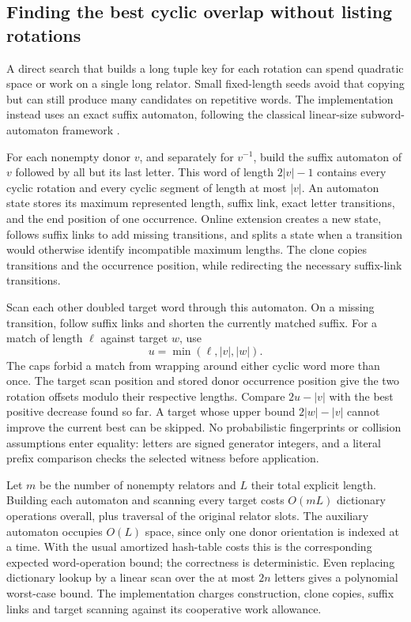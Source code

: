 \subsection{Finding the best cyclic overlap without listing rotations}

A direct search that builds a long tuple key for each rotation can spend
quadratic space or work on a single long relator.  Small fixed-length
seeds avoid that copying but can still produce many candidates on
repetitive words.  The implementation instead uses an exact suffix
automaton, following the classical linear-size subword-automaton
framework \cite{blumer-subwords}.

For each nonempty donor $v$, and separately for $v^{-1}$, build the
suffix automaton of $v$ followed by all but its last letter.  This word of
length $2|v|-1$ contains every cyclic rotation and every cyclic segment of
length at most $|v|$.  An automaton state stores its maximum represented
length, suffix link, exact letter transitions, and the end position of
one occurrence.  Online extension creates a new state, follows suffix
links to add missing transitions, and splits a state when a transition
would otherwise identify incompatible maximum lengths.  The clone copies
transitions and the occurrence position, while redirecting the necessary
suffix-link transitions.

Scan each other doubled target word through this automaton.  On a missing
transition, follow suffix links and shorten the currently matched suffix.
For a match of length $\ell$ against target $w$, use
\[
 u=\min(\ell,|v|,|w|).
\]
The caps forbid a match from wrapping around either cyclic word more than
once.  The target scan position and stored donor occurrence position give
the two rotation offsets modulo their respective lengths.  Compare
$2u-|v|$ with the best positive decrease found so far.  A target whose
upper bound $2|w|-|v|$ cannot improve the current best can be skipped.
No probabilistic fingerprints or collision assumptions enter equality:
letters are signed generator integers, and a literal prefix comparison
checks the selected witness before application.

Let $m$ be the number of nonempty relators and $L$ their total explicit
length.  Building each automaton and scanning every target costs
$O(mL)$ dictionary operations overall, plus traversal of the original
relator slots.  The auxiliary automaton occupies $O(L)$ space, since only
one donor orientation is indexed at a time.  With the usual amortized
hash-table costs this is the corresponding expected word-operation bound;
the correctness is deterministic.  Even replacing dictionary lookup by a
linear scan over the at most $2n$ letters gives a polynomial worst-case
bound.  The implementation charges construction, clone copies, suffix
links and target scanning against its cooperative work allowance.

